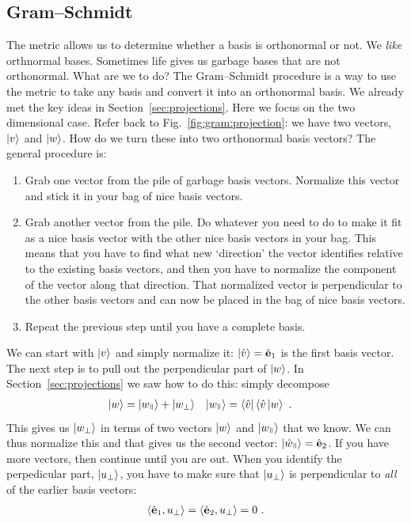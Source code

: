 \documentclass[12pt]{article}
\begin{document}
\subsection{Gram--Schmidt}

The metric allows us to determine whether a basis is orthonormal or not. We \emph{like} orthnormal bases. Sometimes life gives us garbage bases that are not orthonormal. What are we to do? The Gram--Schmidt procedure is a way to use the metric to take any basis and convert it into an orthonormal basis. We already met the key ideas in Section~\ref{sec:projections}. Here we focus on the two dimensional case. Refer back to Fig.~\ref{fig:gram:projection}: we have two vectors, $\left|v\right\rangle$ and $\left|w\right\rangle$. How do we turn these into two orthonormal basis vectors?
%
The general procedure is:
\begin{enumerate}
    \item Grab one vector from the pile of garbage basis vectors. Normalize this vector and stick it in your bag of nice basis vectors. 
    \item Grab another vector from the pile. Do whatever you need to do to make it fit as a nice basis vector with the other nice basis vectors in your bag. This means that you have to find what new `direction' the vector identifies relative to the existing basis vectors, and then you have to normalize the component of the vector along that direction. That normalized vector is perpendicular to the other basis vectors and can now be placed in the bag of nice basis vectors.
    \item Repeat the previous step until you have a complete basis. 
\end{enumerate}

We can start with $\left|v\right\rangle$ and simply normalize it: $\left|\hat{v}\right\rangle = \hat{\mathbf{e}}_1$ is the first basis vector. The next step is to pull out the perpendicular part of $\left|w\right\rangle$. In Section~\ref{sec:projections} we saw how to do this: simply decompose
\begin{align}
    \ket{w} &= \ket{w_\paral} + \ket{w_\perp}
    &
    \ket{w_\paral} &=  \bra{\hat v}\la \hat v \ket{w} \ .
\end{align}
This gives us $\left|w_\perp\right\rangle$ in terms of two vectors $\left|w\right\rangle$ and $\ket{w_\paral}$ that we know. We can thus normalize this and that gives us the second vector: $\ket{\hat{w}_\paral} = \bas{e}_2$. If you have more vectors, then continue until you are out. When you identify the perpedicular part, $\left|u_\perp\right\rangle$, you have to make sure that $\left|u_\perp\right\rangle$ is perpendicular to \emph{all} of the earlier basis vectors:
\begin{align}
    \langle \hat{\mathbf{e}}_1, u_\perp \rangle =
    \langle \hat{\mathbf{e}}_2, u_\perp \rangle =
    0 \ .
\end{align}
\end{document}
